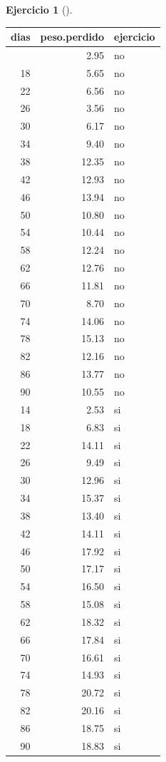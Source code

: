 \documentclass[
  a4paper,
]{scrreport}
\theoremstyle{definition}
\newtheorem{exercise}{Ejercicio}[chapter]
\theoremstyle{remark}
\begin{document}
\begin{exercise}[]
\begin{enumerate}
\begin{tcolorbox}
  \begin{longtable}[]{@{}rrl@{}}
  \toprule\noalign{}
  dias & peso.perdido & ejercicio \\
  \midrule\noalign{}
  \endhead
  \bottomrule\noalign{}
  \endlastfoot
  14 & 2.95 & no \\
  18 & 5.65 & no \\
  22 & 6.56 & no \\
  26 & 3.56 & no \\
  30 & 6.17 & no \\
  34 & 9.40 & no \\
  38 & 12.35 & no \\
  42 & 12.93 & no \\
  46 & 13.94 & no \\
  50 & 10.80 & no \\
  54 & 10.44 & no \\
  58 & 12.24 & no \\
  62 & 12.76 & no \\
  66 & 11.81 & no \\
  70 & 8.70 & no \\
  74 & 14.06 & no \\
  78 & 15.13 & no \\
  82 & 12.16 & no \\
  86 & 13.77 & no \\
  90 & 10.55 & no \\
  14 & 2.53 & si \\
  18 & 6.83 & si \\
  22 & 14.11 & si \\
  26 & 9.49 & si \\
  30 & 12.96 & si \\
  34 & 15.37 & si \\
  38 & 13.40 & si \\
  42 & 14.11 & si \\
  46 & 17.92 & si \\
  50 & 17.17 & si \\
  54 & 16.50 & si \\
  58 & 15.08 & si \\
  62 & 18.32 & si \\
  66 & 17.84 & si \\
  70 & 16.61 & si \\
  74 & 14.93 & si \\
  78 & 20.72 & si \\
  82 & 20.16 & si \\
  86 & 18.75 & si \\
  90 & 18.83 & si \\
  \end{longtable}


\end{tcolorbox}
\end{enumerate}
\end{exercise}
\end{document}
